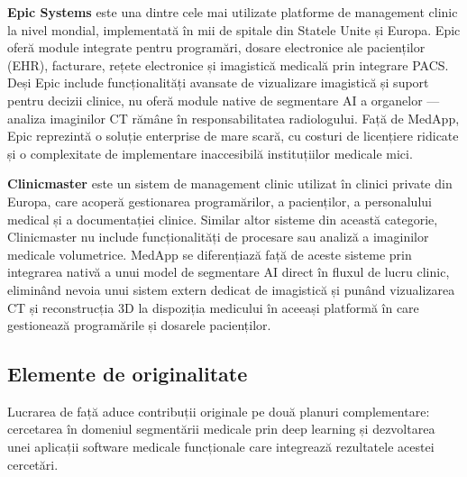 \documentclass[12pt, a4paper]{report}
\begin{document}
\textbf{Epic Systems} este una dintre cele mai utilizate platforme
de management clinic la nivel mondial, implementată în mii de
spitale din Statele Unite și Europa. Epic oferă module integrate
pentru programări, dosare electronice ale pacienților (EHR),
facturare, rețete electronice și imagistică medicală prin
integrare PACS. Deși Epic include funcționalități avansate de
vizualizare imagistică și suport pentru decizii clinice, nu oferă
module native de segmentare AI a organelor — analiza imaginilor
CT rămâne în responsabilitatea radiologului. Față de MedApp,
Epic reprezintă o soluție enterprise de mare scară, cu costuri
de licențiere ridicate și o complexitate de implementare
inaccesibilă instituțiilor medicale mici.

\textbf{Clinicmaster} este un sistem de management clinic utilizat
în clinici private din Europa, care acoperă gestionarea
programărilor, a pacienților, a personalului medical și a
documentației clinice. Similar altor sisteme din această
categorie, Clinicmaster nu include funcționalități de procesare
sau analiză a imaginilor medicale volumetrice. MedApp se
diferențiază față de aceste sisteme prin integrarea nativă a
unui model de segmentare AI direct în fluxul de lucru clinic,
eliminând nevoia unui sistem extern dedicat de imagistică și
punând vizualizarea CT și reconstrucția 3D la dispoziția
medicului în aceeași platformă în care gestionează programările
și dosarele pacienților.



\subsection{Elemente de originalitate}

Lucrarea de față aduce contribuții originale pe două planuri
complementare: cercetarea în domeniul segmentării medicale prin
deep learning și dezvoltarea unei aplicații software medicale
funcționale care integrează rezultatele acestei cercetări.
\end{document}
